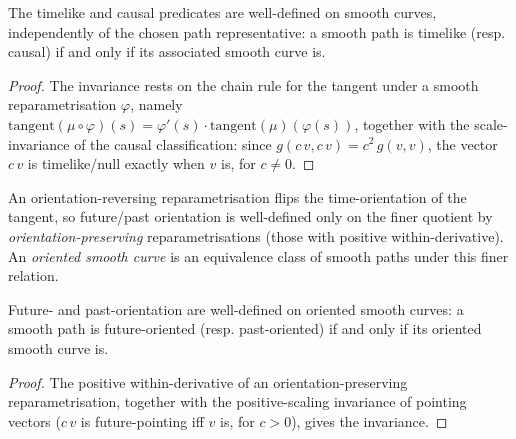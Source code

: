 \begin{theorem}
    \label{thrm:smooth-curve-causal-well-defined}
    \leanok
    The timelike and causal predicates are well-defined on smooth curves, independently of the chosen path representative: a smooth path is timelike (resp. causal) if and only if its associated smooth curve is.
\end{theorem}
\begin{proof}
    \leanok
    The invariance rests on the chain rule for the tangent under a smooth reparametrisation $\varphi$, namely $\mathrm{tangent}(\mu\circ\varphi)(s) = \varphi'(s)\cdot\mathrm{tangent}(\mu)(\varphi(s))$, together with the scale-invariance of the causal classification: since $g(c\,v, c\,v) = c^2\, g(v,v)$, the vector $c\,v$ is timelike/null exactly when $v$ is, for $c \neq 0$.
\end{proof}

\begin{definition}
    \label{def:oriented-smooth-curve}
    \leanok
    An orientation-reversing reparametrisation flips the time-orientation of the tangent, so future/past orientation is well-defined only on the finer quotient by \emph{orientation-preserving} reparametrisations (those with positive within-derivative). An \emph{oriented smooth curve} is an equivalence class of smooth paths under this finer relation.
\end{definition}

\begin{theorem}
    \label{thrm:oriented-curve-well-defined}
    \leanok
    Future- and past-orientation are well-defined on oriented smooth curves: a smooth path is future-oriented (resp. past-oriented) if and only if its oriented smooth curve is.
\end{theorem}
\begin{proof}
    \leanok
    The positive within-derivative of an orientation-preserving reparametrisation, together with the positive-scaling invariance of pointing vectors ($c\,v$ is future-pointing iff $v$ is, for $c > 0$), gives the invariance.
\end{proof}

